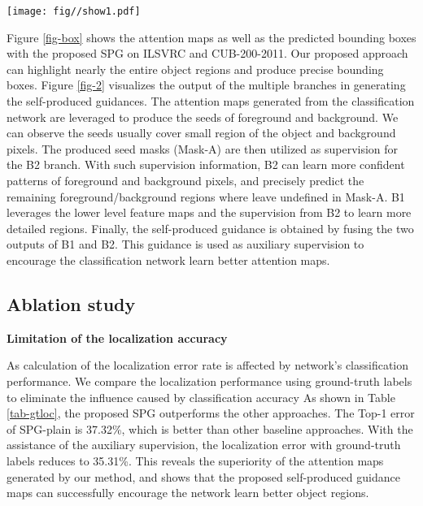 \documentclass[runningheads]{llncs}
\begin{document}
\begin{figure*}
  \centering
  \texttt{[image: fig//show1.pdf]}
  \caption{Output maps of the proposed SPG approach. The localization maps usually only highlight small region of the object. We extract the seeds of the self-produced guidance by segmenting the confident regions of the localization maps as foreground (white) and background (black), and ignore the left regions (grey). These seeds are applied as supervision to learn better self-produced guidance maps. Finally, the learned maps are leveraged to encourage the network to improve the quality of the localization maps.}\label{fig-2}
\end{figure*}

Figure \ref{fig-box} shows the attention maps as well as the predicted bounding boxes with the proposed SPG on ILSVRC and CUB-200-2011.
Our proposed approach can highlight nearly the entire object regions and produce precise bounding boxes.
Figure \ref{fig-2} visualizes the output of the multiple branches in generating the self-produced guidances.
The attention maps generated from the classification network are leveraged to produce the seeds of foreground and background. 
We can observe the seeds usually cover small region of the object and background pixels. 
The produced seed masks (Mask-A) are then utilized as supervision for the B2 branch.
With such supervision information, B2 can learn more confident patterns of foreground and background pixels,
and precisely predict the remaining foreground/background regions where leave undefined in Mask-A. 
B1 leverages the lower level feature maps and the supervision from B2 to learn more detailed regions.  
Finally, the self-produced guidance is obtained  by fusing the two outputs of B1 and B2.
This guidance is used as auxiliary supervision to encourage the classification network learn better attention maps.

\subsection{Ablation study}
\textbf{Limitation of the localization accuracy}

As calculation of the localization error rate is affected by network's classification performance.
We compare the localization performance using ground-truth labels to eliminate the influence caused by classification accuracy
As shown in Table \ref{tab-gtloc}, the proposed SPG outperforms the other approaches.
The Top-1 error of SPG-plain is 37.32\%, which is better than other baseline approaches.
With the assistance of the auxiliary supervision, the localization error with ground-truth labels reduces to 35.31\%.
This reveals the superiority of the attention maps generated by our method, and shows that the proposed self-produced guidance maps can successfully encourage the network learn better object regions.
\end{document}
